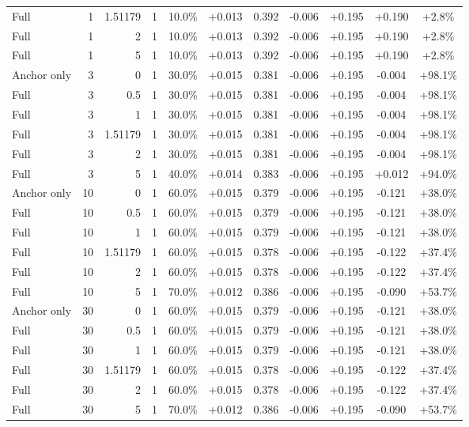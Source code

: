 \begin{table}[htbp]
\begin{tabular}{lrrrccccccc}
Full & 1 & 1.51179 & 1 & 10.0\% & +0.013 & 0.392 & -0.006 & +0.195 & +0.190 & +2.8\% \\
Full & 1 & 2 & 1 & 10.0\% & +0.013 & 0.392 & -0.006 & +0.195 & +0.190 & +2.8\% \\
Full & 1 & 5 & 1 & 10.0\% & +0.013 & 0.392 & -0.006 & +0.195 & +0.190 & +2.8\% \\
Anchor only & 3 & 0 & 1 & 30.0\% & +0.015 & 0.381 & -0.006 & +0.195 & -0.004 & +98.1\% \\
Full & 3 & 0.5 & 1 & 30.0\% & +0.015 & 0.381 & -0.006 & +0.195 & -0.004 & +98.1\% \\
Full & 3 & 1 & 1 & 30.0\% & +0.015 & 0.381 & -0.006 & +0.195 & -0.004 & +98.1\% \\
Full & 3 & 1.51179 & 1 & 30.0\% & +0.015 & 0.381 & -0.006 & +0.195 & -0.004 & +98.1\% \\
Full & 3 & 2 & 1 & 30.0\% & +0.015 & 0.381 & -0.006 & +0.195 & -0.004 & +98.1\% \\
Full & 3 & 5 & 1 & 40.0\% & +0.014 & 0.383 & -0.006 & +0.195 & +0.012 & +94.0\% \\
Anchor only & 10 & 0 & 1 & 60.0\% & +0.015 & 0.379 & -0.006 & +0.195 & -0.121 & +38.0\% \\
Full & 10 & 0.5 & 1 & 60.0\% & +0.015 & 0.379 & -0.006 & +0.195 & -0.121 & +38.0\% \\
Full & 10 & 1 & 1 & 60.0\% & +0.015 & 0.379 & -0.006 & +0.195 & -0.121 & +38.0\% \\
Full & 10 & 1.51179 & 1 & 60.0\% & +0.015 & 0.378 & -0.006 & +0.195 & -0.122 & +37.4\% \\
Full & 10 & 2 & 1 & 60.0\% & +0.015 & 0.378 & -0.006 & +0.195 & -0.122 & +37.4\% \\
Full & 10 & 5 & 1 & 70.0\% & +0.012 & 0.386 & -0.006 & +0.195 & -0.090 & +53.7\% \\
Anchor only & 30 & 0 & 1 & 60.0\% & +0.015 & 0.379 & -0.006 & +0.195 & -0.121 & +38.0\% \\
Full & 30 & 0.5 & 1 & 60.0\% & +0.015 & 0.379 & -0.006 & +0.195 & -0.121 & +38.0\% \\
Full & 30 & 1 & 1 & 60.0\% & +0.015 & 0.379 & -0.006 & +0.195 & -0.121 & +38.0\% \\
Full & 30 & 1.51179 & 1 & 60.0\% & +0.015 & 0.378 & -0.006 & +0.195 & -0.122 & +37.4\% \\
Full & 30 & 2 & 1 & 60.0\% & +0.015 & 0.378 & -0.006 & +0.195 & -0.122 & +37.4\% \\
Full & 30 & 5 & 1 & 70.0\% & +0.012 & 0.386 & -0.006 & +0.195 & -0.090 & +53.7\% \\

\end{tabular}
\end{table}
